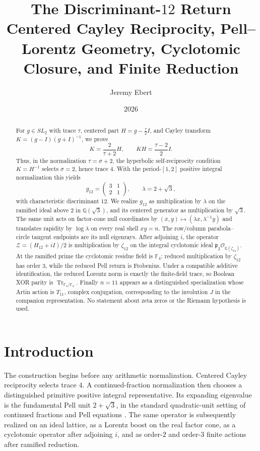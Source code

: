 \documentclass[11pt]{article}
\title{\textbf{The Discriminant-$12$ Return}\\
\large Centered Cayley Reciprocity, Pell--Lorentz Geometry, Cyclotomic Closure, and Finite Reduction}
\author{Jeremy Ebert}
\date{2026}
\theoremstyle{remark}
\newcommand{\Q}{\mathbb Q}
\newcommand{\F}{\mathbb F}
\newcommand{\OO}{\mathcal O}
\newcommand{\Tr}{\operatorname{Tr}}
\begin{document}
\maketitle

\begin{abstract}
For $g\in SL_2$ with trace $\tau$, centered part
$H=g-\tfrac{\tau}{2}I$, and Cayley transform
$K=(g-I)(g+I)^{-1}$, we prove
\[
K=\frac{2}{\tau+2}H,
\qquad
KH=\frac{\tau-2}{2}I.
\]
Thus, in the normalization $\tau=\sigma+2$, the hyperbolic self-reciprocity
condition $K=H^{-1}$ selects $\sigma=2$, hence trace $4$.  With the
period-$[1,2]$ positive integral normalization this yields
\[
g_{12}=\begin{pmatrix}3&1\\2&1\end{pmatrix},
\qquad
\lambda=2+\sqrt3,
\]
with characteristic discriminant $12$.  We realize $g_{12}$ as multiplication
by $\lambda$ on the ramified ideal above $2$ in $\Q(\sqrt3)$, and its centered
generator as multiplication by $\sqrt3$.  The same unit acts on factor-cone
null coordinates by $(x,y)\mapsto(\lambda x,\lambda^{-1}y)$ and translates
rapidity by $\log\lambda$ on every real shell $xy=n$.  The row/column
parabola--circle tangent endpoints are its null eigenrays.  After adjoining
$i$, the operator $\mathcal Z=(H_{12}+iI)/2$ is multiplication by
$\zeta_{12}$ on the integral cyclotomic ideal
$\mathfrak p_2\OO_{\Q(\zeta_{12})}$.  At the ramified prime the cyclotomic
residue field is $\F_4$: reduced multiplication by $\zeta_{12}$ has order
$3$, while the reduced Pell return is Frobenius.  Under a compatible additive
identification, the reduced Lorentz norm is exactly the finite-field trace,
so Boolean XOR parity is $\Tr_{\F_4/\F_2}$.  Finally $n=11$ appears as a
distinguished specialization whose Artin action is $T_{11}$, complex
conjugation, corresponding to the involution $J$ in the companion
representation.  No statement about zeta zeros or the Riemann hypothesis is
used.
\end{abstract}

\section{Introduction}

The construction begins before any arithmetic normalization.  Centered Cayley
reciprocity selects trace $4$.  A continued-fraction normalization then
chooses a distinguished primitive positive integral representative.  Its
expanding eigenvalue is the fundamental Pell unit $2+\sqrt3$, in the standard
quadratic-unit setting of continued fractions and Pell equations
\cite{HardyWright,Serre}.  The same operator is subsequently realized on an
ideal lattice, as a Lorentz boost on the real factor cone, as a cyclotomic
operator after adjoining $i$, and as order-$2$ and order-$3$ finite actions
after ramified reduction.
\end{document}
